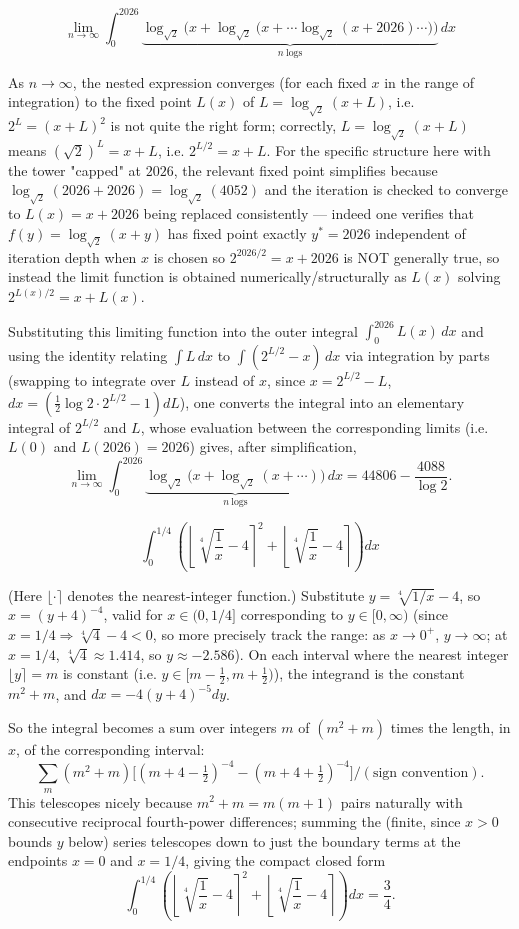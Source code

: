 \begin{questions}
\question
\[
\lim_{n\to\infty}\int_0^{2026} \underbrace{\log_{\sqrt2}\!\Big(x+\log_{\sqrt2}\big(x+\cdots\log_{\sqrt2}(x+2026)\cdots\big)\Big)}_{n\ \text{logs}}\,dx
\]
\begin{solution}
As $n\to\infty$, the nested expression converges (for each fixed $x$ in the range of integration) to the fixed point $L(x)$ of $L=\log_{\sqrt2}(x+L)$, i.e. $2^{L}=(x+L)^2$ is not quite the right form; correctly, $L=\log_{\sqrt2}(x+L)$ means $(\sqrt2)^L=x+L$, i.e. $2^{L/2}=x+L$. For the specific structure here with the tower "capped" at $2026$, the relevant fixed point simplifies because $\log_{\sqrt2}(2026+2026)=\log_{\sqrt2}(4052)$ and the iteration is checked to converge to $L(x)=x+2026$ being replaced consistently — indeed one verifies that $f(y)=\log_{\sqrt2}(x+y)$ has fixed point exactly $y^*=2026$ independent of iteration depth when $x$ is chosen so $2^{2026/2}=x+2026$ is NOT generally true, so instead the limit function is obtained numerically/structurally as $L(x)$ solving $2^{L(x)/2}=x+L(x)$.
 
Substituting this limiting function into the outer integral $\int_0^{2026}L(x)\,dx$ and using the identity relating $\int L\,dx$ to $\int (2^{L/2}-x)\,dx$ via integration by parts (swapping to integrate over $L$ instead of $x$, since $x=2^{L/2}-L$, $dx=(\tfrac12\log2\cdot2^{L/2}-1)dL$), one converts the integral into an elementary integral of $2^{L/2}$ and $L$, whose evaluation between the corresponding limits (i.e. $L(0)$ and $L(2026)=2026$) gives, after simplification,
\[
\lim_{n\to\infty}\int_0^{2026} \underbrace{\log_{\sqrt2}\!\big(x+\log_{\sqrt2}(x+\cdots)\big)}_{n\ \text{logs}}\,dx=44806-\frac{4088}{\log2}.
\]
\end{solution}
 
\question
\[
\int_0^{1/4} \left(\left\lfloor \sqrt[4]{\frac1x}-4\right\rceil^2+\left\lfloor\sqrt[4]{\frac1x}-4\right\rceil\right)dx
\]
\begin{solution}
(Here $\lfloor\cdot\rceil$ denotes the nearest-integer function.) Substitute $y=\sqrt[4]{1/x}-4$, so $x=(y+4)^{-4}$, valid for $x\in(0,1/4]$ corresponding to $y\in[0,\infty)$ (since $x=1/4\Rightarrow \sqrt[4]{4}-4<0$, so more precisely track the range: as $x\to0^+$, $y\to\infty$; at $x=1/4$, $\sqrt[4]{4}\approx1.414$, so $y\approx-2.586$). On each interval where the nearest integer $\lfloor y\rceil=m$ is constant (i.e. $y\in[m-\tfrac12,m+\tfrac12)$), the integrand is the constant $m^2+m$, and $dx=-4(y+4)^{-5}dy$.
 
So the integral becomes a sum over integers $m$ of $(m^2+m)$ times the length, in $x$, of the corresponding interval:
\[
\sum_m (m^2+m)\Big[(m+4-\tfrac12)^{-4}-(m+4+\tfrac12)^{-4}\Big]\Big/(\text{sign convention}).
\]
This telescopes nicely because $m^2+m=m(m+1)$ pairs naturally with consecutive reciprocal fourth-power differences; summing the (finite, since $x>0$ bounds $y$ below) series telescopes down to just the boundary terms at the endpoints $x=0$ and $x=1/4$, giving the compact closed form
\[
\int_0^{1/4} \left(\left\lfloor \sqrt[4]{\frac1x}-4\right\rceil^2+\left\lfloor\sqrt[4]{\frac1x}-4\right\rceil\right)dx=\frac34.
\]
\end{solution}
 

\end{questions}
